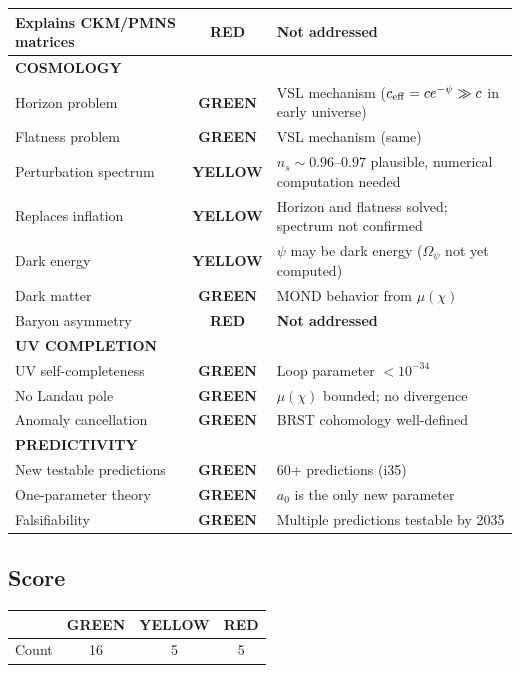 \documentclass[11pt,a4paper]{article}
\newcommand{\GREEN}{\textcolor{dfdgreen}{\textbf{GREEN}}}
\newcommand{\YELLOW}{\textcolor{dfdyellow}{\textbf{YELLOW}}}
\newcommand{\RED}{\textcolor{dfdred}{\textbf{RED}}}
\begin{document}
\begin{center}
\begin{longtable}{p{6cm}cp{6cm}}
Explains CKM/PMNS matrices & \RED & \textbf{Not addressed} \\
\midrule
\multicolumn{3}{l}{\textbf{COSMOLOGY}} \\
\midrule
Horizon problem & \GREEN & VSL mechanism ($c_{\rm eff} = ce^{-\psi} \gg c$ in early universe) \\
Flatness problem & \GREEN & VSL mechanism (same) \\
Perturbation spectrum & \YELLOW & $n_s \sim 0.96$--$0.97$ plausible, numerical computation needed \\
Replaces inflation & \YELLOW & Horizon and flatness solved; spectrum not confirmed \\
Dark energy & \YELLOW & $\psi$ may be dark energy ($\Omega_\psi$ not yet computed) \\
Dark matter & \GREEN & MOND behavior from $\mu(\chi)$ \\
Baryon asymmetry & \RED & \textbf{Not addressed} \\
\midrule
\multicolumn{3}{l}{\textbf{UV COMPLETION}} \\
\midrule
UV self-completeness & \GREEN & Loop parameter $< 10^{-34}$ \\
No Landau pole & \GREEN & $\mu(\chi)$ bounded; no divergence \\
Anomaly cancellation & \GREEN & BRST cohomology well-defined \\
\midrule
\multicolumn{3}{l}{\textbf{PREDICTIVITY}} \\
\midrule
New testable predictions & \GREEN & 60+ predictions (i35) \\
One-parameter theory & \GREEN & $a_0$ is the only new parameter \\
Falsifiability & \GREEN & Multiple predictions testable by 2035 \\
\bottomrule
\end{longtable}
\end{center}

\subsection{Score}

\begin{center}
\begin{tabular}{lccc}
\toprule
& \GREEN & \YELLOW & \RED \\
\midrule
Count & 16 & 5 & 5 \\
\bottomrule
\end{tabular}
\end{center}
\end{document}
